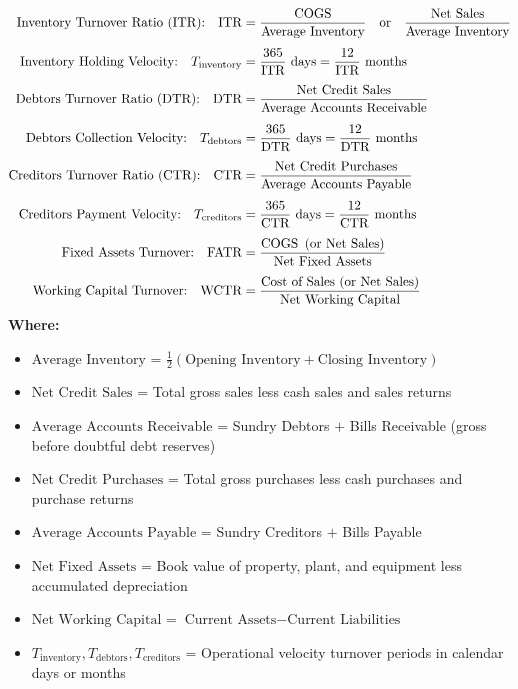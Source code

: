 \begin{formulabox}
\begin{align*}
    \text{Inventory Turnover Ratio (ITR):} \quad \text{ITR} &= \frac{\operatorname{COGS}}{\text{Average Inventory}} \quad \text{or} \quad \frac{\text{Net Sales}}{\text{Average Inventory}} \\[4pt]
    \text{Inventory Holding Velocity:} \quad T_{\text{inventory}} &= \frac{365}{\text{ITR}} \text{ days} = \frac{12}{\text{ITR}} \text{ months} \\[4pt]
    \text{Debtors Turnover Ratio (DTR):} \quad \text{DTR} &= \frac{\text{Net Credit Sales}}{\text{Average Accounts Receivable}} \\[4pt]
    \text{Debtors Collection Velocity:} \quad T_{\text{debtors}} &= \frac{365}{\text{DTR}} \text{ days} = \frac{12}{\text{DTR}} \text{ months} \\[4pt]
    \text{Creditors Turnover Ratio (CTR):} \quad \text{CTR} &= \frac{\text{Net Credit Purchases}}{\text{Average Accounts Payable}} \\[4pt]
    \text{Creditors Payment Velocity:} \quad T_{\text{creditors}} &= \frac{365}{\text{CTR}} \text{ days} = \frac{12}{\text{CTR}} \text{ months} \\[4pt]
    \text{Fixed Assets Turnover:} \quad \text{FATR} &= \frac{\operatorname{COGS} \text{ (or Net Sales)}}{\text{Net Fixed Assets}} \\[4pt]
    \text{Working Capital Turnover:} \quad \text{WCTR} &= \frac{\text{Cost of Sales (or Net Sales)}}{\text{Net Working Capital}}
\end{align*}
\textbf{Where:}
\begin{itemize}[noitemsep, topsep=2pt]
    \item $\text{Average Inventory}$ = $\frac{1}{2}(\text{Opening Inventory} + \text{Closing Inventory})$
    \item $\text{Net Credit Sales}$ = Total gross sales less cash sales and sales returns
    \item $\text{Average Accounts Receivable}$ = Sundry Debtors $+$ Bills Receivable (gross before doubtful debt reserves)
    \item $\text{Net Credit Purchases}$ = Total gross purchases less cash purchases and purchase returns
    \item $\text{Average Accounts Payable}$ = Sundry Creditors $+$ Bills Payable
    \item $\text{Net Fixed Assets}$ = Book value of property, plant, and equipment less accumulated depreciation
    \item $\text{Net Working Capital}$ = $\text{Current Assets} - \text{Current Liabilities}$
    \item $T_{\text{inventory}}, T_{\text{debtors}}, T_{\text{creditors}}$ = Operational velocity turnover periods in calendar days or months
\end{itemize}
\end{formulabox}


